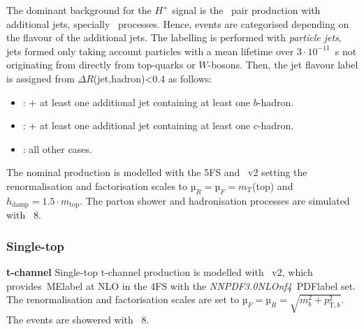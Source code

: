 The dominant background for the $H^+$ signal is the \ttbar\ pair production with additional jets, specially \ttb\ processes. Hence, events are categorised depending on the flavour of the additional jets. The labelling is performed with \textit{particle jets}, jets formed only taking account particles with a mean lifetime over $3\cdot10^{-11}$~s not originating from directly from top-quarks or $W$-bosons. Then, the jet flavour label is assigned from $\Delta R$(jet,hadron)<0.4 as follows:
\begin{itemize}
    \item \ttb: \ttbar + at least one additional jet containing at least one $b$-hadron.
    \item \ttc: \ttbar + at least one additional jet containing at least one $c$-hadron.
    \item \ttl: all other cases.
\end{itemize}

The nominal production is modelled with the 5FS and \POWHEGBOX~v2 setting the renormalisation and factorisation scales to $µ_R = µ_F = m_\text{T}$(top) and $h_\text{damp}=1.5\cdot m_\text{top}$. The parton shower and hadronisation processes are simulated with \PYTHIA~8.

\subsubsection{Single-top}
\textbf{t-channel}
Single-top t-channel production is modelled with \POWHEGBOX~v2, which provides~\acrshort{MElabel} at NLO in the 4FS with the \textit{NNPDF3.0NLOnf4}~\acrshort{PDFlabel} set. The renormalisation and factorisation scales are set to $µ_F=µ_R=\sqrt{m_b^2+p_{\text{T},b}^2}$. The events are showered with \PYTHIA~8.

